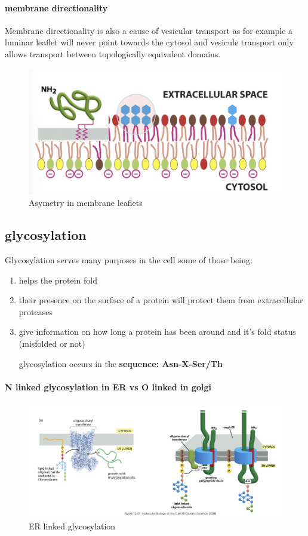 \documentclass[../main.tex]{subfiles}
\begin{document}
\paragraph{membrane directionality}
Membrane directionality is also a cause of vesicular transport as for example a luminar leaflet will never point towards the cytosol and vesicule transport only allows transport between topologically equivalent domains. 

\begin{figure}[H]
    \centering
    \includegraphics[width=0.7\linewidth]{asymetry.png}
    \caption{Asymetry in membrane leaflets}
    \label{fig:enter-label}
\end{figure}

\subsection{glycosylation}
Glycosylation serves many purposes in the cell some of those being: 
\begin{enumerate}
    \item helps the protein fold 
    \item their presence on the surface of a protein will protect them from extracellular proteases
    \item give information on how long a protein has been around and it's fold status (misfolded or not)

glycosylation occurs in the\textbf{ sequence:  Asn-X-Ser/Th}
\end{enumerate}
\paragraph{N linked glycosylation in ER vs O linked in golgi}
\begin{figure}[H]
    \centering
    \includegraphics[width=\linewidth]{Sum_Cell_Bio_II//lectures//cbII4/ERLinkedGlyc.png}
    \caption{ER linked glycosylation}
    \label{fig:enter-label}
\end{figure}
\end{document}

